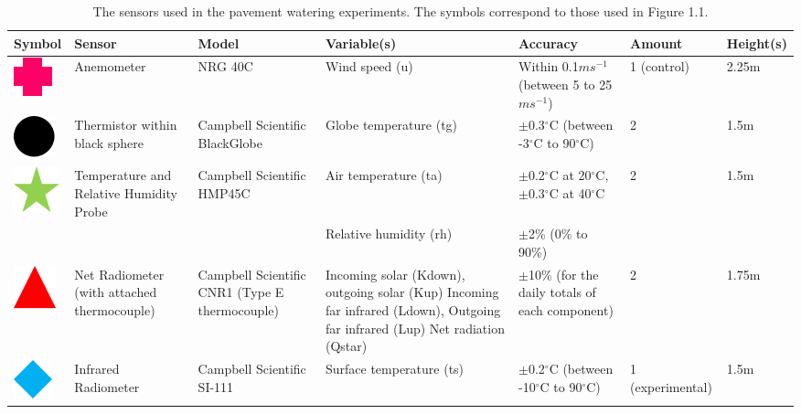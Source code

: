 \documentclass[final,3p,times,authoryear]{elsarticle}
\begin{document}
\begin{table}[!ht]\caption{The sensors used in the pavement watering experiments. The symbols correspond to those used in Figure 1.1.}
    \centering
   \footnotesize 
    \begin{tabular}{|p{0.90cm}|p{2.0cm}|p{2.0cm}|p{3.5cm}|p{2.5cm}|p{1.0cm}|p{1.0cm}|}
    \hline
        Symbol & Sensor & Model & Variable(s) & Accuracy & Amount & Height(s) \\ \hline
        \includegraphics[trim={0 0 0 0},clip,scale=0.5]{Picture1.png}& Anemometer & NRG 40C & Wind speed (\gls{u}) & Within 0.1$ms^{-1}$ (between 5 to 25$ms^{-1}$) & 1 (control) & 2.25m  \\ \hline
        \includegraphics[trim={0 0 0 0},clip,scale=0.5]{Picture2.png}& Thermistor within black sphere & Campbell Scientific BlackGlobe & Globe temperature (\gls{tg}) & $\pm$0.3$^{\circ}$C (between -3$^{\circ}$C to 90$^{\circ}$C) & 2 & 1.5m  \\ \hline               
\includegraphics[trim={0 0 0 0},clip,scale=0.5]{Picture3.png} &Temperature and Relative Humidity Probe &Campbell Scientific HMP45C&Air temperature (\gls{ta})&$\pm$0.2$^{\circ}$C at 20$^{\circ}$C, $\pm$0.3$^{\circ}$C at 40$^{\circ}$C &2&1.5m \\ 
  &&&Relative humidity (\gls{rh})&$\pm$2\% (0\% to 90\%)&& \\ \hline
\includegraphics[trim={0 0 0 0},clip,scale=0.5]{Picture4.png}&Net Radiometer (with attached thermocouple) &Campbell Scientific CNR1 (Type E thermocouple)&Incoming solar (\gls{Kdown}), outgoing solar (\gls{Kup})
Incoming far infrared (\gls{Ldown}),
Outgoing far infrared (\gls{Lup})
Net radiation (\gls{Qstar})&$\pm$10\% (for the daily totals of each component)&2&1.75m \\ \hline 
\includegraphics[trim={0 0 0 0},clip,scale=0.5]{Picture5.png}&Infrared Radiometer&Campbell Scientific SI-111&Surface temperature (\gls{ts})&$\pm$0.2$^{\circ}$C (between -10$^{\circ}$C to 90$^{\circ}$C)&1 (experimental)&1.5m \\ \hline   

\end{tabular}
\end{table}
\end{document}
